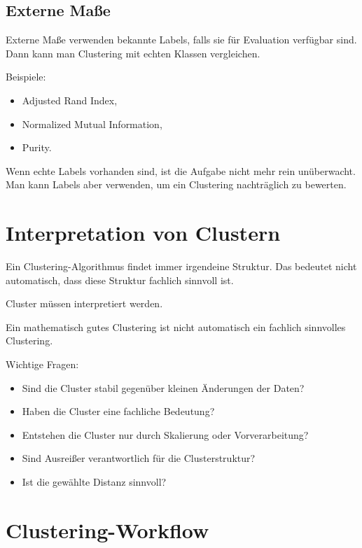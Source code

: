 \subsection{Externe Maße}

Externe Maße verwenden bekannte Labels, falls sie für Evaluation verfügbar sind.
Dann kann man Clustering mit echten Klassen vergleichen.

Beispiele:

\begin{itemize}
    \item Adjusted Rand Index,
    \item Normalized Mutual Information,
    \item Purity.
\end{itemize}

\begin{notebox}
Wenn echte Labels vorhanden sind, ist die Aufgabe nicht mehr rein unüberwacht.
Man kann Labels aber verwenden, um ein Clustering nachträglich zu bewerten.
\end{notebox}

\section{Interpretation von Clustern}

Ein Clustering-Algorithmus findet immer irgendeine Struktur.
Das bedeutet nicht automatisch, dass diese Struktur fachlich sinnvoll ist.

\begin{conceptbox}
Cluster müssen interpretiert werden.

Ein mathematisch gutes Clustering ist nicht automatisch ein fachlich sinnvolles Clustering.
\end{conceptbox}

Wichtige Fragen:

\begin{itemize}
    \item Sind die Cluster stabil gegenüber kleinen Änderungen der Daten?
    \item Haben die Cluster eine fachliche Bedeutung?
    \item Entstehen die Cluster nur durch Skalierung oder Vorverarbeitung?
    \item Sind Ausreißer verantwortlich für die Clusterstruktur?
    \item Ist die gewählte Distanz sinnvoll?
\end{itemize}

\section{Clustering-Workflow}

